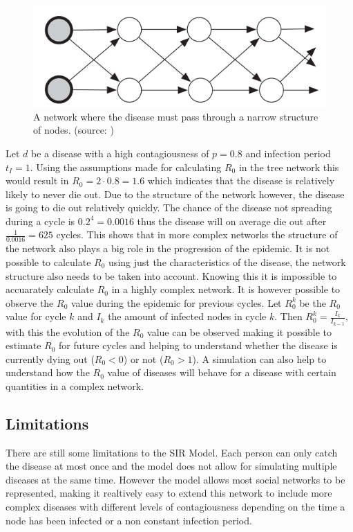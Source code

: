 \begin{figure}
    \centering
    \includegraphics[width=0.5\linewidth]{images/narrow_network.png}
    \caption{A network where the disease must pass through a narrow structure of nodes. (source: \cite{networks})}
    \label{fig:narrow_network}
\end{figure}

Let $d$ be a disease with a high contagiousness of $p=0.8$ and infection period $t_I=1$. 
Using the assumptions made for calculating $R_0$ in the tree network this would result 
in $R_0 = 2 \cdot 0.8 = 1.6$ which indicates that the disease is relatively likely 
to never die out. Due to the structure of the network however, the disease is going to 
die out relatively quickly. The chance of the disease not spreading during a cycle is
$0.2^4=0.0016$ thus the disease will on average die out after $\frac{1}{0.0016}=625$ cycles.
This shows that in more complex networks the structure of the network also plays a big role
in the progression of the epidemic. It is not possible to calculate $R_0$ using just the
characteristics of the disease, the network structure also needs to be taken into account.
Knowing this it is impossible to accuarately calculate $R_0$ in a highly complex network.
It is however possible to observe the $R_0$ value during the epidemic for previous cycles.
Let $R_0^k$ be the $R_0$ value for cycle $k$ and $I_k$ the amount of infected nodes in cycle $k$.
Then $R_0^k = \frac{I_k}{I_{k-1}}$, with this the evolution of the $R_0$ value can be 
observed making it possible to estimate $R_0$ for future cycles and helping to understand
whether the disease is currently dying out ($R_0<0$) or not ($R_0>1$). A simulation can also
help to understand how the $R_0$ value of diseases will behave for a disease with certain 
quantities in a complex network.

\subsection{Limitations}
There are still some limitations to the SIR Model. Each person can only catch the disease at
most once and the model does not allow for simulating multiple diseases at the same time.
However the model allows most social networks to be represented, making it realtively easy
to extend this network to include more complex diseases with different levels of contagiousness
depending on the time a node has been infected or a non constant infection period.

